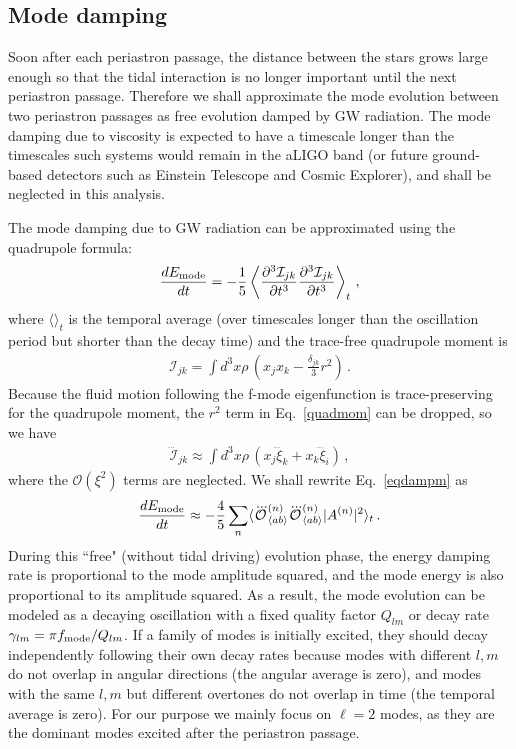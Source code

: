 \documentclass[prd,aps,floatfix,superscriptaddress,nofootinbib,twocolumn,10pt,English]{revtex4}
\begin{document}
\subsection{Mode damping}

Soon after each periastron passage, the distance between the stars grows
large enough so that the tidal interaction is no longer important until
the next periastron passage. Therefore
we shall approximate the mode evolution between two periastron
passages as free evolution damped by GW radiation. The
mode damping due to viscosity is expected to have a timescale longer
than the timescales such systems would remain in the aLIGO band (or
future ground-based detectors such as Einstein Telescope and Cosmic
Explorer), and shall be neglected in this analysis. 

The mode damping due to GW radiation can be approximated using the quadrupole formula:
\begin{align}\label{eqdampm}
\frac{d E_{\rm mode}}{d t} = -\frac{1}{5} \left \langle \frac{\partial^3 \mathcal{I}_{jk}}{\partial t^3} \frac{\partial^3 \mathcal{I}_{jk}}{\partial t^3} \right \rangle_t \,,
\end{align}
where $\langle \rangle_t$ is the temporal average (over timescales longer than the oscillation period but shorter than the decay time) and the trace-free quadrupole moment is 
\begin{align}\label{quadmom}
\mathcal{I}_{jk} = \int d^3 x \rho\, \left (x_j x_k - \frac{\delta_{jk}}{3} r^2 \right )\,.
\end{align}
Because the fluid motion following the f-mode eigenfunction   is trace-preserving for the quadrupole moment, the $r^2$ term in Eq.~\eqref{quadmom} can be dropped, so we have 
\begin{align}
\dddot{\mathcal{I}}_{jk} \approx \int d^3x \rho\, (x_j \dddot{\xi}_k+x_k \dddot{\xi}_i)\,,
\end{align}
where the $\mathcal{O}(\xi^2)$ terms  are neglected.
We shall rewrite Eq.~\eqref{eqdampm} as 
\begin{align}\label{eqerate}
\frac{d E_{\rm mode}}{d t} \approx -\frac{4}{5} \sum_n \langle \dddot{\mathcal{O}}^{(n)}_{\langle ab \rangle}  \dddot{\mathcal{O}}^{(n)}_{\langle ab \rangle} |A^{(n)}|^2 \rangle_t \,.
\end{align} 
During this ``free" (without tidal driving) evolution phase, the energy damping rate is proportional to the mode amplitude squared, and the mode energy is also proportional to its amplitude squared. As a result, the mode evolution can be modeled as a decaying oscillation with a fixed quality factor $Q_{lm}$ or decay rate $\gamma_{lm}=\pi f_{\rm mode}/Q_{lm}$. If a family of modes is initially excited, they should decay independently following their own decay rates because modes with different $l, m$ do not overlap in angular directions (the angular average is zero), and modes with the same $l, m$ but different overtones do not overlap in time (the temporal average is zero). For our purpose we mainly focus on $\ell=2$ modes, as they are the dominant modes excited after the periastron passage.
\end{document}
